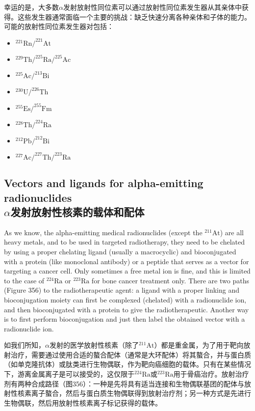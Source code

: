 \documentclass[dvipsnames, svgnames,a4paper,11pt]{article}
\begin{document}
幸运的是，大多数$\alpha$发射放射性同位素可以通过放射性同位素发生器从其亲体中获得。这些发生器通常面临一个主要的挑战：缺乏快速分离各种亲体和子体的能力。可能的放射性同位素发生器对包括：  

\begin{itemize}
  \item \(\mathrm{^{221}Rn/^{221}At}\)
  \item \(\mathrm{^{229}Th/^{225}Ra/^{225}Ac}\)
  \item \(\mathrm{^{225}Ac/^{213}Bi}\)
  \item \(\mathrm{^{230}U/^{226}Th}\)
  \item \(\mathrm{^{255}Es/^{255}Fm}\)
  \item \(\mathrm{^{228}Th/^{224}Ra}\)
  \item \(\mathrm{^{212}Pb/^{212}Bi}\)
  \item \(\mathrm{^{227}Ac/^{227}Th/^{223}Ra}\)
\end{itemize}

\subsection{Vectors and ligands for alpha-emitting radionuclides\\ $\alpha$发射放射性核素的载体和配体}  
As we know, the alpha-emitting medical radionuclides (except the \(\mathrm{^{211}At}\)) are all heavy metals, and to be used in targeted radiotherapy, they need to be chelated by using a proper chelating ligand (usually a macrocyclic) and bioconjugated with a protein (like monoclonal antibody) or a peptide that serves as a vector for targeting a cancer cell. Only sometimes a free metal ion is fine, and this is limited to the case of \(\mathrm{^{224}Ra}\) or \(\mathrm{^{223}Ra}\) for bone cancer treatment only. There are two paths (Figure 356) to the radiotherapeutic agent: a ligand with a proper linking and bioconjugation moiety can first be complexed (chelated) with a radionuclide ion, and then bioconjugated with a protein to give the radiotherapeutic. Another way is to first perform bioconjugation and just then label the obtained vector with a radionuclide ion.  

如我们所知，$\alpha$发射的医学放射性核素（除了\(\mathrm{^{211}At}\)）都是重金属，为了用于靶向放射治疗，需要通过使用合适的螯合配体（通常是大环配体）将其螯合，并与蛋白质（如单克隆抗体）或肽类进行生物偶联，作为靶向癌细胞的载体。只有在某些情况下，游离金属离子是可以接受的，这仅限于\(\mathrm{^{224}Ra}\)或\(\mathrm{^{223}Ra}\)用于骨癌治疗。放射治疗剂有两种合成路径（图356）：一种是先将具有适当连接和生物偶联基团的配体与放射性核素离子螯合，然后与蛋白质生物偶联得到放射治疗剂；另一种方式是先进行生物偶联，然后用放射性核素离子标记获得的载体。  
\end{document}
